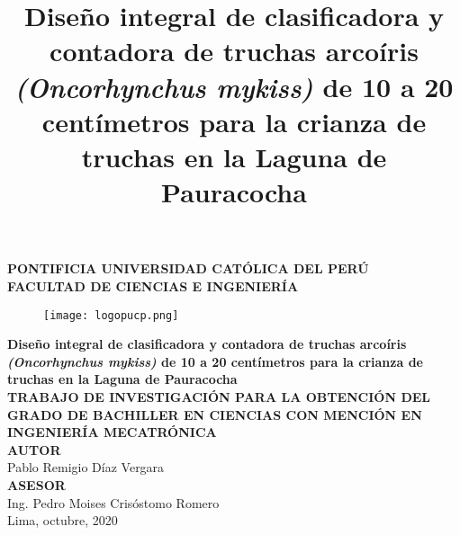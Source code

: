 \clearpage{\pagestyle{empty}\cleardoublepage}
\begin{titlepage}
\begin{center}
 {\Large \bf PONTIFICIA UNIVERSIDAD CATÓLICA DEL PERÚ}\\
  \vspace{0.8 cm} 
  {\Large \bf FACULTAD DE CIENCIAS E INGENIERÍA}\\
  \vspace{1.75 cm}
 \begin{figure}[H]
    \centering
    \texttt{[image: logopucp.png]}
\end{figure}
  \vspace{0.25cm}

\title{Diseño integral de clasificadora y contadora de truchas arcoíris \textit{(Oncorhynchus mykiss)} de 10 a 20 centímetros para la crianza de truchas en la Laguna de Pauracocha} %
{\Large \bf Diseño integral de clasificadora y contadora de truchas arcoíris \textit{(Oncorhynchus mykiss)} de 10 a 20 centímetros para la crianza de truchas en la Laguna de Pauracocha}\\ %
\vspace{0.5cm}
{\Large \bf TRABAJO DE INVESTIGACIÓN PARA LA OBTENCIÓN DEL GRADO DE BACHILLER EN CIENCIAS CON MENCIÓN EN INGENIERÍA MECATRÓNICA}\\[2.0 cm]
{\large \bf AUTOR}\\[0.5cm]
{\large Pablo Remigio Díaz Vergara}\\[1.5 cm] %
{\large \bf ASESOR}\\[0.5 cm] 
{\large Ing. Pedro Moises Crisóstomo Romero}\\[0.5 cm] %
\vspace{1.5 cm}
{\large Lima, octubre, 2020}

\end{center}
\end{titlepage}